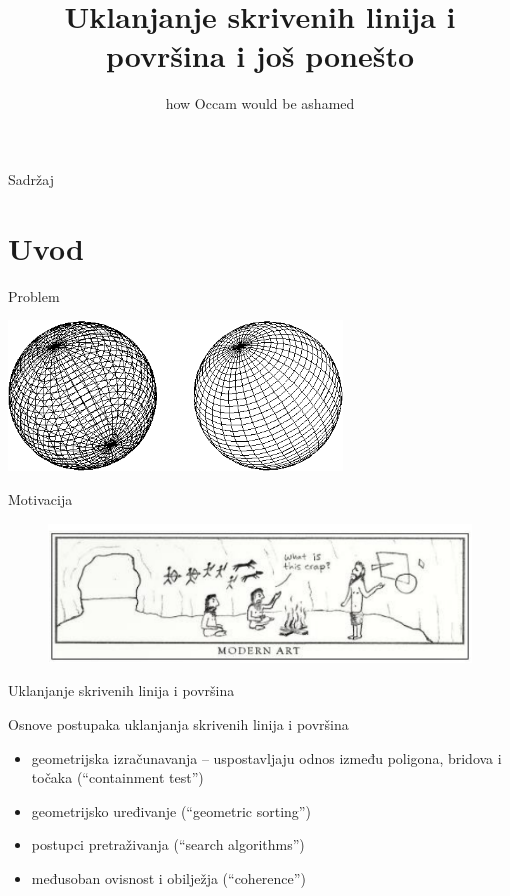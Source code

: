 \documentclass[9pt]{beamer}
\title{Uklanjanje skrivenih linija i površina i još ponešto}
\subtitle{how Occam would be ashamed}
\institute{Računalna grafika}
\begin{document}
\begin{frame}
 \titlepage
\end{frame}

\begin{frame}{Sadržaj}
  \tableofcontents
\end{frame}
\section{Uvod}
\begin{frame}{Problem}
	\begin{center}
		\includegraphics[height=4cm]{./slike/meshSpheres.png}
	\end{center}
\end{frame}

\begin{frame}{Motivacija}
	\begin{figure}
		\centering
		\includegraphics[width=0.9\linewidth]{./slike/modern_art}
	\end{figure}
	
\end{frame}
\begin{frame}{Uklanjanje skrivenih linija i površina}
	\begin{block}{Osnove postupaka uklanjanja skrivenih linija i površina}
		\begin{itemize}
			\item geometrijska izračunavanja – uspostavljaju odnos između poligona, bridova i točaka (“containment test”)
			\item geometrijsko uređivanje (“geometric sorting”)
			\item postupci pretraživanja (“search algorithms”)
			\item međusoban ovisnost i obilježja (“coherence”)
		\end{itemize}
	\end{block}
\end{frame}
\end{document}
